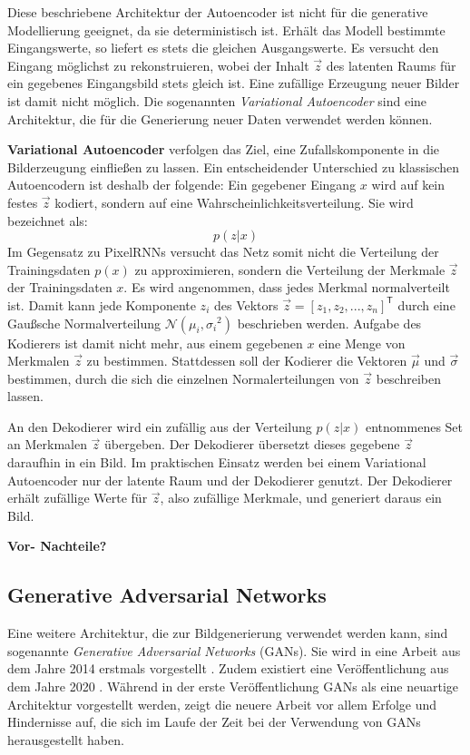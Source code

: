 Diese beschriebene Architektur der Autoencoder ist nicht für die generative Modellierung geeignet, da sie deterministisch ist. Erhält das Modell bestimmte Eingangswerte, so liefert es stets die gleichen Ausgangswerte. Es versucht den Eingang möglichst zu rekonstruieren, wobei der Inhalt $\vec{z}$ des latenten Raums für ein gegebenes Eingangsbild stets gleich ist. Eine zufällige Erzeugung neuer Bilder ist damit nicht möglich. Die sogenannten \emph{Variational Autoencoder} sind eine Architektur, die für die Generierung neuer Daten verwendet werden können. \cite{visualApproach}

\textbf{Variational Autoencoder} verfolgen das Ziel, eine Zufallskomponente in die Bilderzeugung einfließen zu lassen. Ein entscheidender Unterschied zu klassischen Autoencodern ist deshalb der folgende: Ein gegebener Eingang $x$ wird auf kein festes $\vec{z}$ kodiert, sondern auf eine Wahrscheinlichkeitsverteilung. Sie wird bezeichnet als:
\begin{equation}
   p(z|x)
\end{equation}
Im Gegensatz zu \acp{PixelRNN} versucht das Netz somit nicht die Verteilung der Trainingsdaten $p(x)$ zu approximieren, sondern die Verteilung der Merkmale $\vec{z}$ der Trainingsdaten $x$.
Es wird angenommen, dass jedes Merkmal normalverteilt ist. Damit kann jede Komponente $z_{i}$ des Vektors $\vec{z} = [z_{1}, z_{2}, ..., z_{n}]^\mathsf{T}$ durch eine Gaußsche Normalverteilung $\mathcal{N}(\mu_{i}, {\sigma_{i}}^{2})$ beschrieben werden. Aufgabe des Kodierers ist damit nicht mehr, aus einem gegebenen $x$ eine Menge von Merkmalen $\vec{z}$ zu bestimmen. Stattdessen soll der Kodierer die Vektoren $\vec{\mu}$ und $\vec{\sigma}$ bestimmen, durch die sich die einzelnen Normalerteilungen von $\vec{z}$ beschreiben lassen. 

An den Dekodierer wird ein zufällig aus der Verteilung $p(z|x)$ entnommenes Set an Merkmalen $\vec{z}$ übergeben.
Der Dekodierer übersetzt dieses gegebene $\vec{z}$ daraufhin in ein Bild. Im praktischen Einsatz werden bei einem Variational Autoencoder nur der latente Raum und der Dekodierer genutzt. Der Dekodierer erhält zufällige Werte für $\vec{z}$, also zufällige Merkmale, und generiert daraus ein Bild.

\textbf{Vor- Nachteile?}

\cite{autoencoders}

\label{chap:GANs}
\subsection{Generative Adversarial Networks}
Eine weitere Architektur, die zur Bildgenerierung verwendet werden kann, sind sogenannte \emph{Generative Adversarial Networks} (\acsp{GAN}). Sie wird in eine Arbeit aus dem Jahre 2014 erstmals vorgestellt \cite{Goodfellow-GANs}. Zudem existiert eine Veröffentlichung aus dem Jahre 2020 \cite{GANs}. Während in der erste Veröffentlichung \acp{GAN} als eine neuartige Architektur vorgestellt werden, zeigt die neuere Arbeit vor allem Erfolge und Hindernisse auf, die sich im Laufe der Zeit bei der Verwendung von \acp{GAN} herausgestellt haben.

